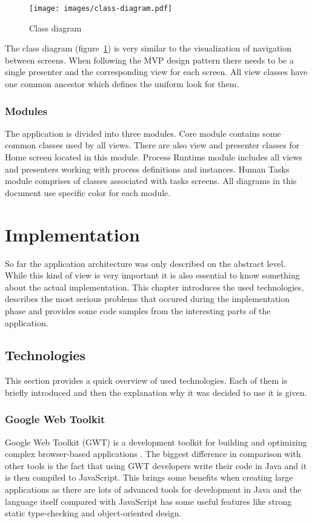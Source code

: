 \documentclass[12pt,oneside,final]{fithesis2}
\begin{document}
\begin{figure}[ht!]
\centering
\texttt{[image: images/class-diagram.pdf]}
\caption{Class diagram}
\label{fig:class-diagram}
\end{figure}

The class diagram (figure~\ref{fig:class-diagram}) is very similar to the visualization of navigation between screens.
When following the MVP design pattern there needs to be a single presenter and the corresponding view for each screen.
All view classes have one common ancestor which defines the uniform look for them.

\subsection{Modules}
The application is divided into three modules.
Core module contains some common classes used by all views.
There are also view and presenter classes for Home screen located in this module.
Process Runtime module includes all views and presenters working with process definitions and instances.
Human Tasks module comprises of classes associated with tasks screens.
All diagrams in this document use specific color for each module.

\chapter{Implementation}
So far the application architecture was only described on the abstract level.
While this kind of view is very important it is also essential to know something about the actual implementation.
This chapter introduces the used technologies, describes the most serious problems that occured during the implementation phase and provides some code samples from the interesting parts of the application.

\section{Technologies}
This section provides a quick overview of used technologies.
Each of them is briefly introduced and then the explanation why it was decided to use it is given.

\subsection{Google Web Toolkit}
Google Web Toolkit (GWT) is a development toolkit for building and optimizing complex browser-based applications \cite{gwtoverview}.
The biggest difference in comparison with other tools is the fact that using GWT developers write their code in Java and it is then compiled to JavaScript.
This brings some benefits when creating large applications as there are lots of advanced tools for development in Java and the language itself compared with JavaScript has some useful features like strong static type-checking and object-oriented design.
\end{document}
